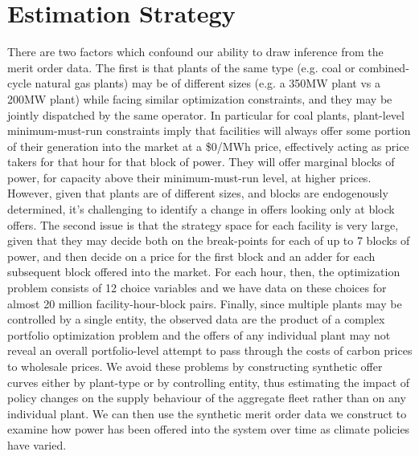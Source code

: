 \documentclass[12pt]{article}
\begin{document}
\section{Estimation Strategy}
There are two factors which confound our ability to draw inference from the merit order data. The first is that plants of the same type (e.g. coal or combined-cycle natural gas plants) may be of different sizes (e.g. a 350MW plant vs a 200MW plant) while facing similar optimization constraints, and they may be jointly dispatched by the same operator. In particular for coal plants, plant-level minimum-must-run constraints imply that facilities will always offer some portion of their generation into the market at a \$0/MWh price, effectively acting as price takers for that hour for that block of power. They will offer marginal blocks of power, for capacity above their minimum-must-run level, at higher prices. However, given that plants are of different sizes, and blocks are endogenously determined, it's challenging to identify a change in offers looking only at block offers. The second issue is that the strategy space for each facility is very large, given that they may decide both on the break-points for each of up to 7 blocks of power, and then decide on a price for the first block and an adder for each subsequent block offered into the market. For each hour, then, the optimization problem consists of 12 choice variables and we have data on these choices for almost 20 million facility-hour-block pairs. Finally, since multiple plants may be controlled by a single entity, the observed data are the product of a complex portfolio optimization problem and the offers of any individual plant may not reveal an overall portfolio-level attempt to pass through the costs of carbon prices to wholesale prices. We avoid these problems by constructing synthetic offer curves either by plant-type or by controlling entity, thus estimating the impact of policy changes on the supply behaviour of the aggregate fleet rather than on any individual plant. We can then use the synthetic merit order data we construct to examine how power has been offered into the system over time as climate policies have varied.
\end{document}

